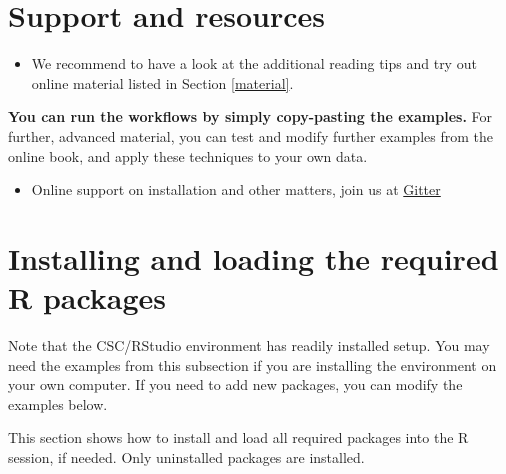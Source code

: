 \documentclass[
  oneside]{book}
\providecommand{\tightlist}{%
  \setlength{\itemsep}{0pt}\setlength{\parskip}{0pt}}
\begin{document}
\hypertarget{support-and-resources}{%
\section{Support and resources}\label{support-and-resources}}

\begin{itemize}
\tightlist
\item
  We recommend to have a look at the additional reading tips and try out online material listed in Section \ref{material}.
\end{itemize}

\textbf{You can run the workflows by simply copy-pasting the examples.} For
further, advanced material, you can test and modify further examples
from the online book, and apply these techniques to your own data.

\begin{itemize}
\tightlist
\item
  Online support on installation and other matters, join us at \href{https://gitter.im/microbiome/miaverse?utm_source=badge\&utm_medium=badge\&utm_campaign=pr-badge\&utm_content=badge}{Gitter}
\end{itemize}

\hypertarget{packages}{%
\section{Installing and loading the required R packages}\label{packages}}

Note that the CSC/RStudio environment has readily installed setup. You
may need the examples from this subsection if you are installing the
environment on your own computer. If you need to add new packages, you
can modify the examples below.

This section shows how to install and load all required packages into
the R session, if needed. Only uninstalled packages are installed.
\end{document}
